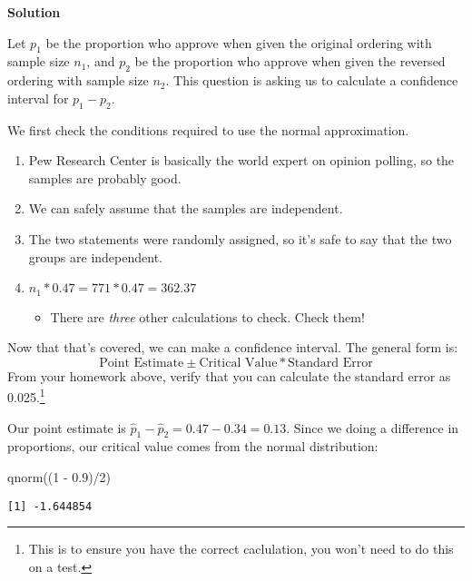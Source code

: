 \documentclass[
  letterpaper,
  DIV=11,
  numbers=noendperiod]{scrreprt}
\newenvironment{Shaded}{\begin{snugshade}}{\end{snugshade}}
\newcommand{\DecValTok}[1]{\textcolor[rgb]{0.68,0.00,0.00}{#1}}
\newcommand{\FloatTok}[1]{\textcolor[rgb]{0.68,0.00,0.00}{#1}}
\newcommand{\FunctionTok}[1]{\textcolor[rgb]{0.28,0.35,0.67}{#1}}
\newcommand{\NormalTok}[1]{\textcolor[rgb]{0.00,0.23,0.31}{#1}}
\newcommand{\SpecialCharTok}[1]{\textcolor[rgb]{0.37,0.37,0.37}{#1}}
\providecommand{\tightlist}{%
  \setlength{\itemsep}{0pt}\setlength{\parskip}{0pt}}\usepackage{longtable,booktabs,array}
\begin{document}
\textbf{Solution}

Let \(p_1\) be the proportion who approve when given the original
ordering with sample size \(n_1\), and \(p_2\) be the proportion who
approve when given the reversed ordering with sample size \(n_2\). This
question is asking us to calculate a confidence interval for
\(p_1 - p_2\).

We first check the conditions required to use the normal approximation.

\begin{enumerate}
\def\labelenumi{\arabic{enumi}.}
\tightlist
\item
  Pew Research Center is basically the world expert on opinion polling,
  so the samples are probably good.
\item
  We can safely assume that the samples are independent.
\item
  The two statements were randomly assigned, so it's safe to say that
  the two groups are independent.
\item
  \(n_1 * 0.47 = 771 * 0.47 = 362.37\)

  \begin{itemize}
  \tightlist
  \item
    There are \emph{three} other calculations to check. Check them!
  \end{itemize}
\end{enumerate}

Now that that's covered, we can make a confidence interval. The general
form is: \[
\text{Point Estimate}\pm\text{Critical Value}*\text{Standard Error}
\] From your homework above, verify that you can calculate the standard
error as 0.025.\footnote{This is to ensure you have the correct
  caclulation, you won't need to do this on a test.}

Our point estimate is \(\hat p_1 - \hat p_2 = 0.47 - 0.34 = 0.13\).
Since we doing a difference in proportions, our critical value comes
from the normal distribution:

\begin{Shaded}
\begin{Highlighting}[]
\FunctionTok{qnorm}\NormalTok{((}\DecValTok{1} \SpecialCharTok{{-}} \FloatTok{0.9}\NormalTok{)}\SpecialCharTok{/}\DecValTok{2}\NormalTok{)}
\end{Highlighting}
\end{Shaded}

\begin{verbatim}
[1] -1.644854
\end{verbatim}
\end{document}
